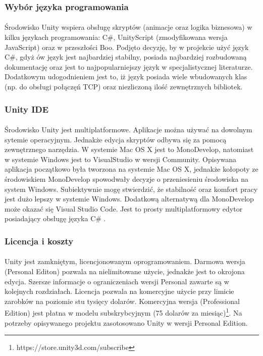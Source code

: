 \subsubsection{Wybór języka programowania}
\paragraph{}
Środowisko Unity wspiera obsługę skryptów (animacje oraz logika biznesowa) w kilku językach programowania: C\#, UnityScript (zmodyfikowana wersja JavaScript)  oraz w przeszłości Boo. Podjęto decyzję, by w projekcie użyć język C\#, gdyż ów język jest najbardziej stabilny, posiada najbardziej rozbudowaną dokumentację oraz jest to najpopularniejszy język w specjalistycznej literaturze. Dodatkowym udogodnieniem  jest to, iż  język posiada wiele wbudowanych klas (np. do obsługi połączęń TCP) oraz niezliczoną ilość zewnętrznych bibliotek.
\subsubsection{Unity IDE}
\paragraph{}
Środowisko Unity jest multiplatformowe. Aplikacje można używać na dowolnym sytemie operacyjnym. Jednakże edycja skryptów odbywa się za pomocą zewnętrznego narzędzia. W systemie Mac OS X jest to MonoDevelop, natomiast w systemie Windows jest to VisualStudio w wersji Community. Opisywana aplikacja początkowo była tworzona na systemie Mac OS X, jednakże kołopoty ze środowiskiem MonoDevelop spowodwały decyzje o przeniesieniu środowiska na system Windows. Subiektywnie mogę stwierdzić, że stabilność oraz komfort pracy jest dużo lepszy w systemie Windows.
Dodatkową alternatywą dla MonoDevelop może okazać się Visual Studio Code. Jest to prosty multiplatformowy edytor posiadający obsługę języka C\# .

\subsubsection{Licencja i koszty}
\paragraph{}
Unity jest zamkniętym, licencjonowanym oprogramowaniem. Darmowa wersja (Personal Editon) pozwala na nielimitowane użycie, jednakże jest to okrojona edycja. Szersze informacje o ograniczeniach wersji Personal zawarte są w kolejnych rozdziałach. Licencja pozwala na komercyjne użycie przy limicie zarobków na poziomie stu tysięcy dolarów.
Komercyjna wersja (Professional Edition) jest płatna w modelu subskrybcyjnym (75 dolarów za miesiąc)\footnote{https://store.unity3d.com/subscribe}.
Na potrzeby opisywanego projektu zasotosowano Unity w wersji Personal Edition.

